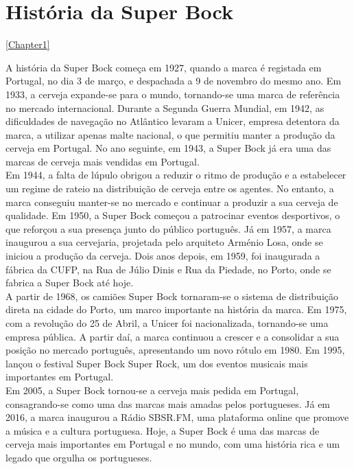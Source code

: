 \chapter*{História da Super Bock}
\label{Chapter1} %
\ref{Chapter1}

A história da Super Bock começa em 1927, quando a marca é registada em Portugal, no dia 3 de março, e despachada a 9 de novembro do mesmo ano. Em 1933, a cerveja expande-se para o mundo, tornando-se uma marca de referência no mercado internacional. Durante a Segunda Guerra Mundial, em 1942, as dificuldades de navegação no Atlântico levaram a Unicer, empresa detentora da marca, a utilizar apenas malte nacional, o que permitiu manter a produção da cerveja em Portugal. No ano seguinte, em 1943, a Super Bock já era uma das marcas de cerveja mais vendidas em Portugal.\\

Em 1944, a falta de lúpulo obrigou a reduzir o ritmo de produção e a estabelecer um regime de rateio na distribuição de cerveja entre os agentes. No entanto, a marca conseguiu manter-se no mercado e continuar a produzir a sua cerveja de qualidade. Em 1950, a Super Bock começou a patrocinar eventos desportivos, o que reforçou a sua presença junto do público português. Já em 1957, a marca inaugurou a sua cervejaria, projetada pelo arquiteto Arménio Losa, onde se iniciou a produção da cerveja. Dois anos depois, em 1959, foi inaugurada a fábrica da CUFP, na Rua de Júlio Dinis e Rua da Piedade, no Porto, onde se fabrica a Super Bock até hoje.\\

A partir de 1968, os camiões Super Bock tornaram-se o sistema de distribuição direta na cidade do Porto, um marco importante na história da marca. Em 1975, com a revolução do 25 de Abril, a Unicer foi nacionalizada, tornando-se uma empresa pública. A partir daí, a marca continuou a crescer e a consolidar a sua posição no mercado português, apresentando um novo rótulo em 1980. Em 1995, lançou o festival Super Bock Super Rock, um dos eventos musicais mais importantes em Portugal.\\

Em 2005, a Super Bock tornou-se a cerveja mais pedida em Portugal, consagrando-se como uma das marcas mais amadas pelos portugueses. Já em 2016, a marca inaugurou a Rádio SBSR.FM, uma plataforma online que promove a música e a cultura portuguesa. Hoje, a Super Bock é uma das marcas de cerveja mais importantes em Portugal e no mundo, com uma história rica e um legado que orgulha os portugueses.\\
